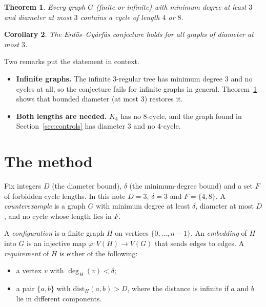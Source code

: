 \documentclass[11pt]{article}
\newtheorem{theorem}{Theorem}
\newtheorem{corollary}[theorem]{Corollary}
\theoremstyle{remark}
\begin{document}
\begin{theorem}\label{thm:main}
Every graph $G$ (finite or infinite) with minimum degree at least $3$ and diameter at most $3$
contains a cycle of length $4$ or $8$.
\end{theorem}

\begin{corollary}
The Erd\H{o}s--Gy\'arf\'as conjecture holds for all graphs of diameter at most $3$.
\end{corollary}

Two remarks put the statement in context.
\begin{itemize}
\item \textbf{Infinite graphs.} The infinite $3$-regular tree has minimum degree $3$ and no cycles at
  all, so the conjecture fails for infinite graphs in general. Theorem~\ref{thm:main} shows that
  bounded diameter (at most $3$) restores it.
\item \textbf{Both lengths are needed.} $K_4$ has no $8$-cycle, and the graph found in
  Section~\ref{sec:controls} has diameter $3$ and no $4$-cycle.
\end{itemize}

\section{The method}

Fix integers $D$ (the diameter bound), $\delta$ (the minimum-degree bound) and a set $F$ of forbidden
cycle lengths. In this note $D=3$, $\delta=3$ and $F=\{4,8\}$. A \emph{counterexample} is a graph $G$
with minimum degree at least $\delta$, diameter at most $D$, and no cycle whose length lies in $F$.

A \emph{configuration} is a finite graph $H$ on vertices $\{0,\dots,n-1\}$. An \emph{embedding} of
$H$ into $G$ is an injective map $\varphi:V(H)\to V(G)$ that sends edges to edges. A
\emph{requirement} of $H$ is either of the following:
\begin{itemize}
\item a vertex $v$ with $\deg_H(v)<\delta$;
\item a pair $\{a,b\}$ with $\mathrm{dist}_H(a,b)>D$, where the distance is infinite if $a$ and $b$
  lie in different components.
\end{itemize}
\end{document}
